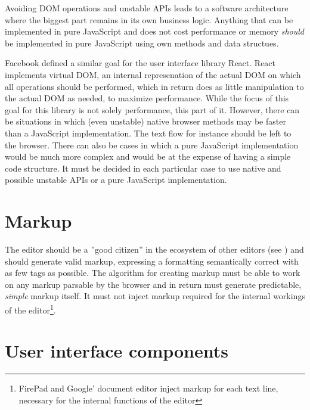 Avoiding DOM operations and unstable APIs leads to a software architecture where the biggest part remains in its own business logic. Anything that can be implemented in pure JavaScript and does not cost performance or memory \textit{should} be implemented in pure JavaScript using own methods and data structues.

Facebook defined a similar goal for the user interface library React. React implements virtual DOM, an internal represenation of the actual DOM on which all operations should be performed, which in return does as little manipulation to the actual DOM as needed, to maximize performance. While the focus of this goal for this library is not solely performance, this part of it. However, there can be situations in which (even unstable) native browser methods may be faster than a JavaScript implementation. The text flow for instance should be left to the browser. There can also be cases in which a pure JavaScript implementation would be much more complex and would be at the expense of having a simple code structure. It must be decided in each particular case to use native and possible unstable APIs or a pure JavaScript implementation.


\section{Markup} 

The editor should be a ''good citizen'' in the ecosystem of other editors (see ) and should generate valid markup, expressing a formatting semantically correct with as few tags as possible. The algorithm for creating markup must be able to work on any markup parsable by the browser and in return must generate predictable, \textit{simple} markup itself. It must not inject markup required for the internal workings of the editor\footnote{FirePad and Google' document editor inject markup for each text line, necessary for the internal functions of the editor}.



\section{User interface components}

